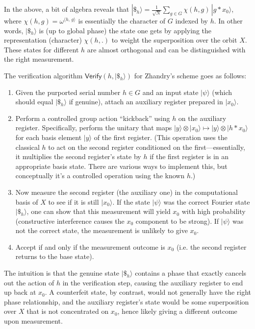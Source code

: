 \documentclass[12pt]{report}
\begin{document}
In the above, a bit of algebra reveals that $|\$_h\rangle = \frac{1}{\sqrt{N}} \sum_{g\in G} \chi(h,g)\, |g * x_0\rangle$, where $\chi(h,g) = \omega^{\langle h,\,g \rangle}$ is essentially the character of $G$ indexed by $h$. In other words, $|\$_h\rangle$ is (up to global phase) the state one gets by applying the representation (character) $\chi(h,.)$ to weight the superposition over the orbit $X$. These states for different $h$ are almost orthogonal and can be distinguished with the right measurement.

The verification algorithm $\mathsf{Verify}(h, |\$_h\rangle)$ for Zhandry’s scheme goes as follows:
\begin{enumerate}
    \item Given the purported serial number $h \in G$ and an input state $|\psi\rangle$ (which should equal $|\$_h\rangle$ if genuine), attach an auxiliary register prepared in $|x_0\rangle$.
    \item Perform a controlled group action “kickback” using $h$ on the auxiliary register. Specifically, perform the unitary that maps $|y\rangle \otimes |x_0\rangle \mapsto |y\rangle \otimes |h * x_0 \rangle$ for each basis element $|y\rangle$ of the first register. (This operation uses the classical $h$ to act on the second register conditioned on the first—essentially, it multiplies the second register’s state by $h$ if the first register is in an appropriate basis state. There are various ways to implement this, but conceptually it’s a controlled operation using the known $h$.)
    \item Now measure the second register (the auxiliary one) in the computational basis of $X$ to see if it is still $|x_0\rangle$. If the state $|\psi\rangle$ was the correct Fourier state $|\$_h\rangle$, one can show that this measurement will yield $x_0$ with high probability (constructive interference causes the $x_0$ component to be strong). If $|\psi\rangle$ was not the correct state, the measurement is unlikely to give $x_0$.
    \item Accept if and only if the measurement outcome is $x_0$ (i.e. the second register returns to the base state).
\end{enumerate}

The intuition is that the genuine state $|\$_h\rangle$ contains a phase that exactly cancels out the action of $h$ in the verification step, causing the auxiliary register to end up back at $x_0$. A counterfeit state, by contrast, would not generally have the right phase relationship, and the auxiliary register’s state would be some superposition over $X$ that is not concentrated on $x_0$, hence likely giving a different outcome upon measurement.
\end{document}

